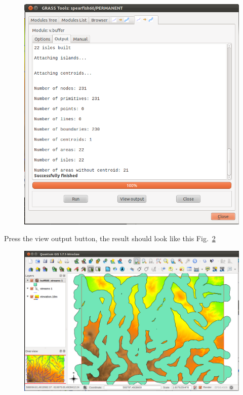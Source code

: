 \begin{figure}[htbp]
   \centering
   \includegraphics[scale=0.3]{qgis036.png}
   \caption{}
   \label{fig:qgis036}
\end{figure}

Press the view output button, the result should look like this Fig.~\ref{fig:qgis037}

\begin{figure}[htbp]
   \centering
   \includegraphics[scale=0.2]{qgis037.png}
   \caption{}
   \label{fig:qgis037}
\end{figure}

